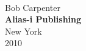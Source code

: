 \cleardoublepage
\vspace*{1.125in}
\begin{center}
{\hfill {\fontsize{70}{100}\selectfont \bookname}}
\\[0.75in]
{\hfill {\Huge Bob Carpenter}}
\\[-1pt]
\vfill
{\hfill {\large\bf Alias-i Publishing}}
\\[1pt]
{\hfill {\small New York}}
\\[-1pt]
{\hfill {\small 2010}}
\end{center}
